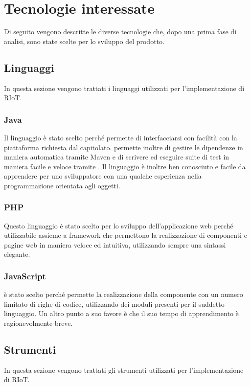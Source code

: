 \section{Tecnologie interessate}
	Di seguito vengono descritte le diverse tecnologie che, dopo una prima fase di analisi, sono state scelte per lo sviluppo del prodotto.
	\subsection{Linguaggi}
		In questa sezione vengono trattati i linguaggi utilizzati per l'implementazione di RIoT.
		\subsubsection{Java}
			Il linguaggio è stato scelto perché permette di interfacciarsi con facilità con la piattaforma  richiesta dal capitolato.  permette inoltre di gestire le dipendenze in maniera automatica tramite Maven e di scrivere ed eseguire suite di test in maniera facile e veloce tramite .
			\newline
			Il linguaggio è inoltre ben conosciuto e facile da apprendere per uno sviluppatore con una qualche esperienza nella programmazione orientata agli oggetti. 
		\subsubsection{PHP}
			Questo linguaggio è stato scelto per lo sviluppo dell'applicazione web perché utilizzabile assieme a framework che permettono la realizzazione di componenti e pagine web in maniera veloce ed intuitiva, utilizzando sempre una sintassi elegante.
		\subsubsection{JavaScript}
			 è stato scelto perché permette la realizzazione della componente  con un numero limitato di righe di codice, utilizzando dei moduli presenti per il suddetto linguaggio.
			\newline
			Un altro punto a suo favore è che il suo tempo di apprendimento è ragionevolmente breve.
	\subsection{Strumenti}
		In questa sezione vengono trattati gli strumenti utilizzati per l'implementazione di RIoT.
